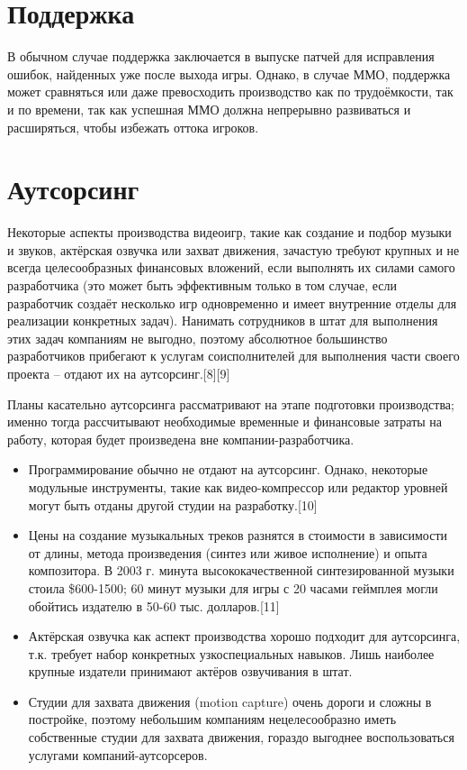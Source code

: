 \section{Поддержка}

В обычном случае поддержка заключается в выпуске патчей для исправления ошибок, найденных уже после выхода 
игры. Однако, в случае ММО, поддержка может сравняться или даже превосходить производство как по 
трудоёмкости, так и по времени, так как успешная ММО должна непрерывно развиваться и расширяться, чтобы 
избежать оттока игроков.

\section{Аутсорсинг}

Некоторые аспекты производства видеоигр, такие как создание и подбор музыки и звуков, актёрская озвучка или 
захват движения, зачастую требуют крупных и не всегда целесообразных финансовых вложений, если выполнять их 
силами самого разработчика (это может быть эффективным только в том случае, если разработчик создаёт 
несколько игр одновременно и имеет внутренние отделы для реализации конкретных задач). Нанимать сотрудников 
в штат для выполнения этих задач компаниям не выгодно, поэтому абсолютное большинство разработчиков 
прибегают к услугам соисполнителей для выполнения части своего проекта -- отдают их на аутсорсинг.[8][9]

Планы касательно аутсорсинга рассматривают на этапе подготовки производства; именно тогда рассчитывают 
необходимые временные и финансовые затраты на работу, которая будет произведена вне компании-разработчика.
\begin{itemize}
    \item Программирование обычно не отдают на аутсорсинг. Однако, некоторые модульные инструменты, такие 
        как видео-компрессор или редактор уровней могут быть отданы другой студии на разработку.[10]
    \item Цены на создание музыкальных треков разнятся в стоимости в зависимости от длины, метода 
        произведения (синтез или живое исполнение) и опыта композитора. В 2003 г. минута высококачественной 
        синтезированной музыки стоила \$600-1500; 60 минут музыки для игры с 20 часами геймплея могли 
        обойтись издателю в 50-60 тыс. долларов.[11]
    \item Актёрская озвучка как аспект производства хорошо подходит для аутсорсинга, т.к. требует набор 
        конкретных узкоспециальных навыков. Лишь наиболее крупные издатели принимают актёров озвучивания в 
        штат.
    \item Студии для захвата движения (motion capture) очень дороги и сложны в постройке, поэтому небольшим 
        компаниям нецелесообразно иметь собственные студии для захвата движения, гораздо выгоднее воспользоваться услугами компаний-аутсорсеров.
\end{itemize}

